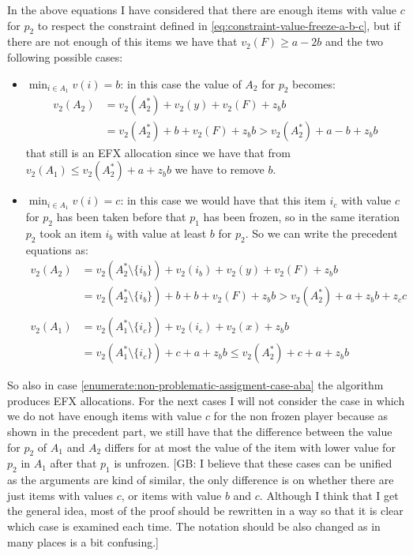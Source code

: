 \documentclass{article}
\newcommand{\gb}[1]{{\color{red}[GB: #1]}}
\begin{document}
In the above equations I have considered that there are enough items with value $c$ for $p_2$ to respect the constraint defined in \ref{eq:constraint-value-freeze-a-b-c}, but if there are not enough of this items we have that $v_2(F) \ge a-2b$ and the two following possible cases:
\begin{itemize}
        \item $\min_{i\in A_1} v(i) = b$: in this case the value of $A_2$ for $p_2$ becomes:
        \begin{align*}
            v_2(A_2) &= v_2(A_2^*) + v_2(y) + v_2(F) + z_b b \\
            &= v_2(A_2^*) + b + v_2(F) + z_bb > v_2(A_2^*) + a-b + z_b b
        \end{align*}
       that still is an EFX allocation since we have that from $v_2(A_1) \le v_2(A_2^*) + a + z_bb$ we have to remove $b$.
        \item $\min_{i\in A_1} v(i) = c$: in this case we would have that this item $i_c$ with value $c$ for $p_2$ has been taken before that $p_1$ has been frozen, so in the same iteration $p_2$ took an item $i_b$ with value at least $b$ for $p_2$. So we can write the precedent equations as:
        \begin{align*}
            v_2(A_2) &= v_2(A_2^*\setminus{\{i_b\}}) + v_2(i_b) + v_2(y) + v_2(F) + z_b b \\
            &= v_2(A_2^*\setminus{\{i_b\}}) + b + b + v_2(F) + z_bb  > v_2(A_2^*) + a + z_b b + z_cc\\\\
            v_2(A_1) &= v_2(A_1^*\setminus{\{i_c\}}) + v_2(i_c)+ v_2(x) + z_bb  \\
            &=v_2(A_1^*\setminus{\{i_c\}}) + c  + a + z_bb \le v_2(A_2^*) + c + a + z_bb 
        \end{align*}
\end{itemize}
So also in case \ref{enumerate:non-problematic-assigment-case-aba} the algorithm produces EFX allocations. For the next cases I will not consider the case in which we do not have enough items with value $c$ for the non frozen player because as shown in the precedent part, we still have that the difference between the value for $p_2$ of $A_1$ and $A_2$ differs for at most the value of the item with lower value for $p_2$ in $A_1$ after that $p_1$ is unfrozen.
\gb{I believe that these cases can be unified as the arguments are kind of similar, the only difference is on whether there are just items with values $c$, or items with value $b$ and $c$. Although I think that I get the general idea, most of the proof should be rewritten in a way so that it is clear which case is examined each time. The notation should be also changed as in many places is a bit confusing.}
\end{document}
